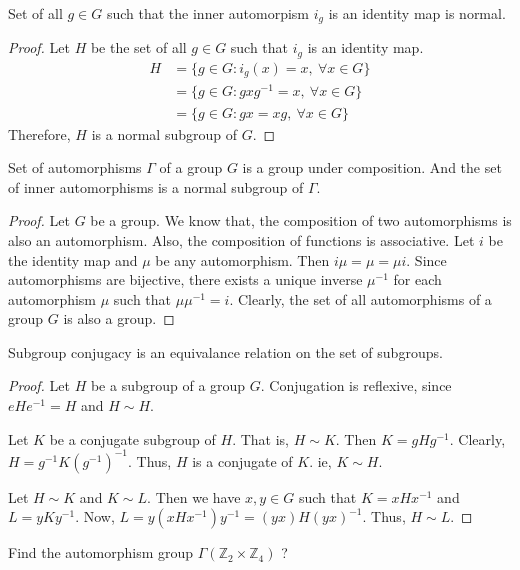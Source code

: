 \begin{remark}
	Set of all $g \in G$ such that the inner automorpism $i_g$ is an identity map is normal.%
\end{remark}
\begin{proof}
	Let $H$ be the set of all $g \in G$ such that $i_g$ is an identity map.
	\begin{align*}
		H & = \{ g \in G : i_g(x) = x,\ \forall x \in G\} \\
		& = \{ g \in G : gxg^{-1} = x,\ \forall x \in G\}\\
		& = \{ g \in G : gx = xg,\ \forall x \in G \}
	\end{align*}
	Therefore, $H$ is a normal subgroup of $G$.
\end{proof}
\begin{remark}
	Set of automorphisms $\Gamma$ of a group $G$ is a group under composition. And the set of inner automorphisms is a normal subgroup of $\Gamma$.
\end{remark}
\begin{proof}
	Let $G$ be a group. We know that, the composition of two automorphisms is also an automorphism. Also, the composition of functions is associative. Let $i$ be the identity map and $\mu$ be any automorphism. Then $i\mu = \mu = \mu i$. Since automorphisms are bijective, there exists a unique inverse $\mu^{-1}$ for each automorphism $\mu$ such that $\mu\mu^{-1} = i$. Clearly, the set of all automorphisms of a group $G$ is also a group.
\end{proof}

\begin{remark}
	Subgroup conjugacy is an equivalance relation on the set of subgroups.%
\end{remark}
\begin{proof}
	Let $H$ be a subgroup of a group $G$. Conjugation is reflexive, since $eHe^{-1} = H$ and $H \sim H$. 
	
	Let $K$ be a conjugate subgroup of $H$. That is, $H \sim K$. Then $K = gHg^{-1}$. Clearly, $H = g^{-1}K(g^{-1})^{-1}$. Thus, $H$ is a conjugate of $K$. ie, $K \sim H$.

	Let $H \sim K$ and $K \sim L$. Then we have $x,y \in G$ such that $K = xHx^{-1}$ and $L = yKy^{-1}$. Now, $L = y(xHx^{-1})y^{-1} = (yx)H(yx)^{-1}$. Thus, $H \sim L$. 
\end{proof}

\begin{question}
	Find the automorphism group $\Gamma(\mathbb{Z}_2 \times \mathbb{Z}_4)$ ?
\end{question}

